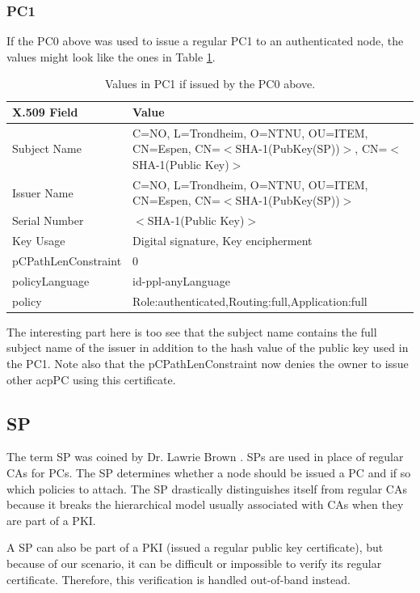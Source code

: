 \subsubsection*{\acf{PC1}}
If the PC0 above was used to issue a regular PC1 to an authenticated node, the
values might look like the ones in Table \ref{tab:pc1_values}.
\begin{table}[h]
	\begin{tabularx}{\linewidth}{ | l | X |}\hline
 		\textbf{X.509 Field} & \textbf{Value}\\\hline
		Subject Name & C=NO, L=Trondheim, O=NTNU, OU=ITEM, CN=Espen, CN=$<$SHA-1(PubKey(SP))$>$, CN=$<$SHA-1(Public Key)$>$ \\\hline
		Issuer Name & C=NO, L=Trondheim, O=NTNU, OU=ITEM, CN=Espen, CN=$<$SHA-1(PubKey(SP))$>$ \\\hline
		Serial Number & $<$SHA-1(Public Key)$>$ \\\hline 
		Key Usage & Digital signature, Key encipherment \\\hline 
		pCPathLenConstraint & 0 \\\hline 
		policyLanguage & id-ppl-anyLanguage \\\hline 
		policy & Role:authenticated,Routing:full,Application:full \\\hline 
	\end{tabularx}
	\caption{Values in \acf{PC1} if issued by the \ac{PC0} above.}
	\label{tab:pc1_values}
\end{table}
The interesting part here is too see that the subject name contains the full
subject name of the issuer in addition to the hash value of the public key used
in the PC1. Note also that the pCPathLenConstraint now denies the owner to issue
other acp{PC} using this certificate.

\subsection{\acf{SP}}
The term \acl{SP} was coined by Dr. Lawrie Brown \cite{lawrie:technotes}.
\acp{SP} are used in place of regular \acp{CA} for \acp{PC}. The \ac{SP}
determines whether a node should be issued a \ac{PC} and if so which policies to
attach. The \ac{SP} drastically distinguishes itself from regular \acp{CA}
because it breaks the hierarchical model usually associated with \acp{CA} when
they are part of a \ac{PKI}.

A \ac{SP} can also be part of a \ac{PKI} (issued a regular public key
certificate), but because of our scenario, it can be difficult or impossible to
verify its regular certificate. Therefore, this verification is handled
out-of-band instead.

